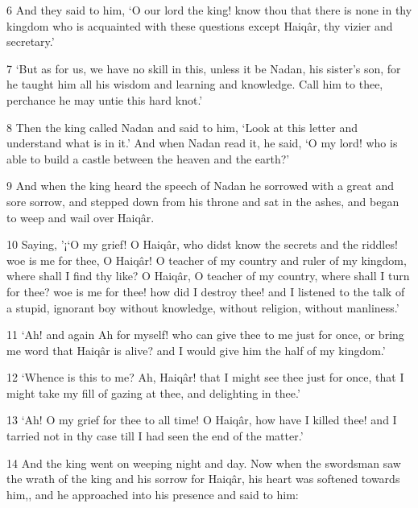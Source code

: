 \par 6 And they said to him, ‘O our lord the king! know thou that there is none in thy kingdom who is acquainted with these questions except Haiqâr, thy vizier and secretary.’

\par 7 ‘But as for us, we have no skill in this, unless it be Nadan, his sister's son, for he taught him all his wisdom and learning and knowledge. Call him to thee, perchance he may untie this hard knot.’

\par 8 Then the king called Nadan and said to him, ‘Look at this letter and understand what is in it.’ And when Nadan read it, he said, ‘O my lord! who is able to build a castle between the heaven and the earth?’

\par 9 And when the king heard the speech of Nadan he sorrowed with a great and sore sorrow, and stepped down from his throne and sat in the ashes, and began to weep and wail over Haiqâr.

\par 10 Saying, '¡‘O my grief! O Haiqâr, who didst know the secrets and the riddles! woe is me for thee, O Haiqâr! O teacher of my country and ruler of my kingdom, where shall I find thy like? O Haiqâr, O teacher of my country, where shall I turn for thee? woe is me for thee! how did I destroy thee! and I listened to the talk of a stupid, ignorant boy without knowledge, without religion, without manliness.’

\par 11 ‘Ah! and again Ah for myself! who can give thee to me just for once, or bring me word that Haiqâr is alive? and I would give him the half of my kingdom.’

\par 12 ‘Whence is this to me? Ah, Haiqâr! that I might see thee just for once, that I might take my fill of gazing at thee, and delighting in thee.’

\par 13 ‘Ah! O my grief for thee to all time! O Haiqâr, how have I killed thee! and I tarried not in thy case till I had seen the end of the matter.’

\par 14 And the king went on weeping night and day. Now when the swordsman saw the wrath of the king and his sorrow for Haiqâr, his heart was softened towards him,, and he approached into his presence and said to him:

